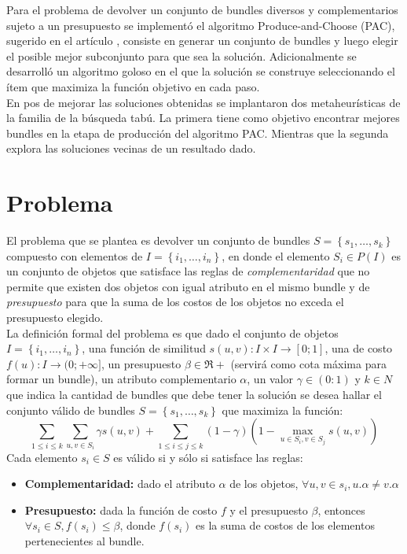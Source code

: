 Para el problema de devolver un conjunto de bundles diversos y complementarios sujeto a un presupuesto se implementó el algoritmo Produce-and-Choose (PAC), sugerido en el artículo \cite{compositeRetrival}, consiste en generar un conjunto de bundles y luego elegir el posible mejor subconjunto para que sea la solución. Adicionalmente se desarrolló un algoritmo goloso en el que la solución se construye seleccionando el ítem que maximiza la función objetivo en cada paso.\\
En pos de mejorar las soluciones obtenidas se implantaron dos metaheurísticas de la familia de la búsqueda tabú. La primera tiene como objetivo encontrar mejores bundles en la etapa de producción del algoritmo PAC. Mientras que la segunda explora las soluciones vecinas de un resultado dado.\\
\section{Problema}
El problema que se plantea es devolver un conjunto de bundles $S = \left\{s_1, \ldots, s_k\right\}$ compuesto con elementos de $I=\left\{i_1,\ldots, i_n\right\}$, en donde el elemento $S_i \in P(I)$ es un conjunto de objetos que satisface las reglas de \textit{complementaridad} que no permite que existen dos objetos con igual atributo en el mismo bundle y de \textit{presupuesto} para que la suma de los costos de los objetos no exceda el presupuesto elegido.\\
La definición formal del problema es que dado el conjunto de objetos $I=\left\{i_1,\ldots, i_n\right\}$, una función de similitud $s(u,v): I \times I \rightarrow [0;1]$, una de costo $f(u): I \rightarrow (0;+\infty]$, un presupuesto $\beta \in \Re+$ (servirá como cota máxima para formar un bundle), un atributo complementario $\alpha$, un valor $\gamma \in (0:1)$ y $k \in N$ que indica la cantidad de bundles que debe tener la solución se desea hallar el conjunto válido de bundles $S = \left\{s_1, \ldots, s_k\right\}$ que maximiza la función:
\begin{equation} \label{des:eq-fnObj}
\sum_{1 \leq i \leq k}{\sum_{u,v \in S_i}{\gamma s(u,v)}} + \sum_{1 \leq i \leq j \leq k}{(1-\gamma) (1-\max_{u \in S_i, v \in S_j}{s(u,v)})}
\end{equation}
Cada elemento $s_i \in S$ es válido si y sólo si satisface las reglas:
\begin{itemize}
	\item \textbf{Complementaridad:} dado el atributo $\alpha$ de los objetos, $\forall u,v \in s_i, u.\alpha \neq v.\alpha$
	\item \textbf{Presupuesto:} dada la función de costo $f$ y el presupuesto $\beta$, entonces $\forall s_i \in S, f(s_i) \leq \beta$, donde $f(s_i)$ es la suma de costos de los elementos pertenecientes al bundle.
\end{itemize}		  

